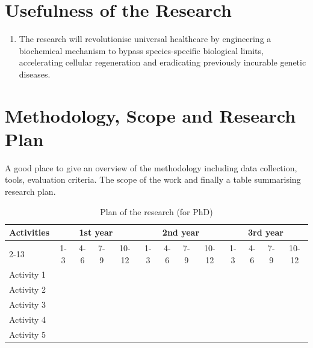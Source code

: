 \documentclass{../class/cscmugradthesis}
\begin{document}
\section{Usefulness of the Research }
\begin{enumerate}
\item The research will revolutionise universal healthcare by engineering a biochemical mechanism to bypass species-specific biological limits, accelerating cellular regeneration and eradicating previously incurable genetic diseases.
\end{enumerate}

\section{Methodology, Scope and Research Plan}
A good place to give an overview of the methodology including data collection, tools, evaluation criteria. The scope of the work and finally a table summarising research plan.

\begin{table}[h!]
\centering
\begin{tabular}{| l | c | c | c | c | c | c | c | c | c | c | c | c |}
\hline 
\multirow{2}{*}{Activities} & \multicolumn{4}{c|}{1st year} &  \multicolumn{4}{c|}{2nd year} & \multicolumn{4}{c|}{3rd year} \\ \cline{2-13}
				     & 1-3 & 4-6 & 7-9  & 10-12 &1-3 & 4-6 & 7-9  & 10-12 & 1-3 & 4-6 & 7-9  & 10-12 \\ \hline
Activity 1 & \cellcolor{blue!25}& \cellcolor{blue!25} & & & & & & & & & & \\ \hline
Activity 2 & & &\cellcolor{blue!25} & \cellcolor{blue!25}& & & & & & & & \\ \hline
Activity 3 & & & & \cellcolor{blue!25}& \cellcolor{blue!25}& \cellcolor{blue!25}& & & & & & \\ \hline
Activity 4 & & & & & & &\cellcolor{blue!25} &\cellcolor{blue!25} &\cellcolor{blue!25} & & & \\ \hline
Activity 5 & & & & & & & & &\cellcolor{blue!25} & \cellcolor{blue!25}& \cellcolor{blue!25}&\cellcolor{blue!25} \\ 
\hline
\end{tabular}
\caption{Plan of the research (for PhD)}
\end{table}
\end{document}
